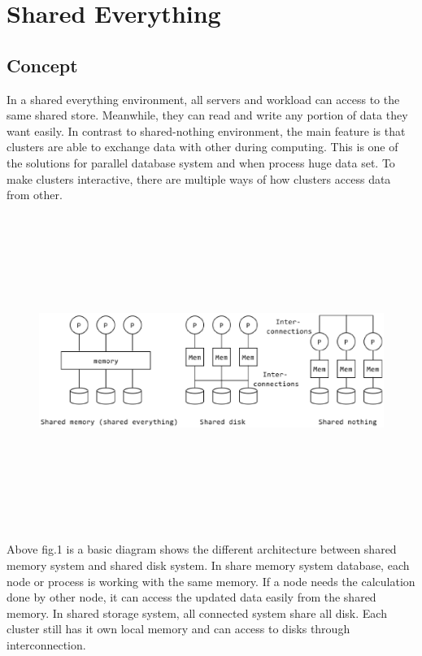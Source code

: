 \documentclass[onecolumn, draftclsnofoot,10pt, compsoc]{IEEEtran}
\begin{document}
	\newpage
	\tableofcontents
	\clearpage
	
	\section{Shared Everything}

    \subsection{Concept}
In a shared everything environment, all servers and workload can access to the same shared store.
Meanwhile, they can read and write any portion of data they want easily.
In contrast to shared-nothing environment, the main feature is that clusters are able to exchange data with other during computing.
This is one of the solutions for parallel database system and when process huge data set. 
To make clusters interactive, there are multiple ways of how clusters access data from other.

\begin{figure}[ht]
    \centering
    \includegraphics[width=\linewidth, height=4in, keepaspectratio]{amyImage1.eps}
\end{figure}

Above fig.1 is a basic diagram shows the different architecture between shared memory system and shared disk system. 
In share memory system database, each node or process is working with the same memory. 
If a node needs the calculation done by other node, it can access the updated data easily from the shared memory. 
In shared storage system, all connected system share all disk. 
Each cluster still has it own local memory and can access to disks through interconnection.
\end{document}
